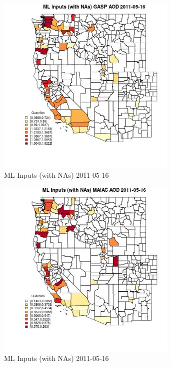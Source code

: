 \begin{figure} 
\centering  
\includegraphics[width=0.77\textwidth]{Code_Outputs/Report_ML_input_PM25_Step4_part_e_de_duplicated_aveswNAs_CountyGASP_AODMean2011-05-16_2011-05-16.jpg} 
\caption{\label{fig:Report_ML_input_PM25_Step4_part_e_de_duplicated_aveswNAsCountyGASP_AODMean2011-05-16_2011-05-16}ML Inputs (with NAs) 2011-05-16} 
\end{figure} 
 

\begin{figure} 
\centering  
\includegraphics[width=0.77\textwidth]{Code_Outputs/Report_ML_input_PM25_Step4_part_e_de_duplicated_aveswNAs_CountyMAIAC_AODMean2011-05-16_2011-05-16.jpg} 
\caption{\label{fig:Report_ML_input_PM25_Step4_part_e_de_duplicated_aveswNAsCountyMAIAC_AODMean2011-05-16_2011-05-16}ML Inputs (with NAs) 2011-05-16} 
\end{figure} 
 

